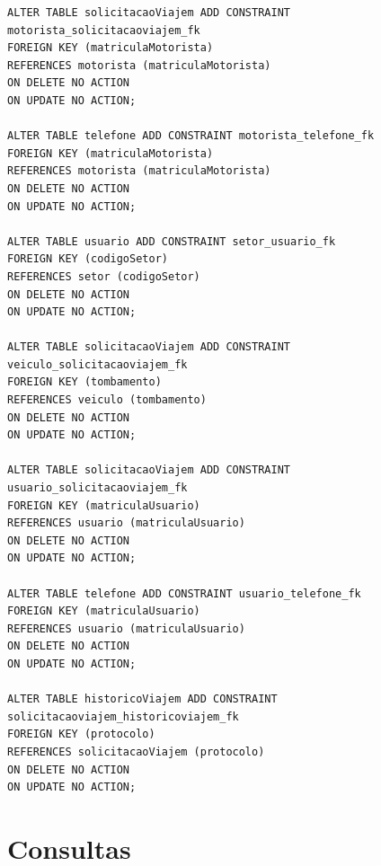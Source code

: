 \documentclass[11pt]{article}
\begin{document}
\begin{verbatim}
ALTER TABLE solicitacaoViajem ADD CONSTRAINT motorista_solicitacaoviajem_fk
FOREIGN KEY (matriculaMotorista)
REFERENCES motorista (matriculaMotorista)
ON DELETE NO ACTION
ON UPDATE NO ACTION;

ALTER TABLE telefone ADD CONSTRAINT motorista_telefone_fk
FOREIGN KEY (matriculaMotorista)
REFERENCES motorista (matriculaMotorista)
ON DELETE NO ACTION
ON UPDATE NO ACTION;

ALTER TABLE usuario ADD CONSTRAINT setor_usuario_fk
FOREIGN KEY (codigoSetor)
REFERENCES setor (codigoSetor)
ON DELETE NO ACTION
ON UPDATE NO ACTION;

ALTER TABLE solicitacaoViajem ADD CONSTRAINT veiculo_solicitacaoviajem_fk
FOREIGN KEY (tombamento)
REFERENCES veiculo (tombamento)
ON DELETE NO ACTION
ON UPDATE NO ACTION;

ALTER TABLE solicitacaoViajem ADD CONSTRAINT usuario_solicitacaoviajem_fk
FOREIGN KEY (matriculaUsuario)
REFERENCES usuario (matriculaUsuario)
ON DELETE NO ACTION
ON UPDATE NO ACTION;

ALTER TABLE telefone ADD CONSTRAINT usuario_telefone_fk
FOREIGN KEY (matriculaUsuario)
REFERENCES usuario (matriculaUsuario)
ON DELETE NO ACTION
ON UPDATE NO ACTION;

ALTER TABLE historicoViajem ADD CONSTRAINT solicitacaoviajem_historicoviajem_fk
FOREIGN KEY (protocolo)
REFERENCES solicitacaoViajem (protocolo)
ON DELETE NO ACTION
ON UPDATE NO ACTION;

\end{verbatim}

\section{Consultas}
\end{document}
